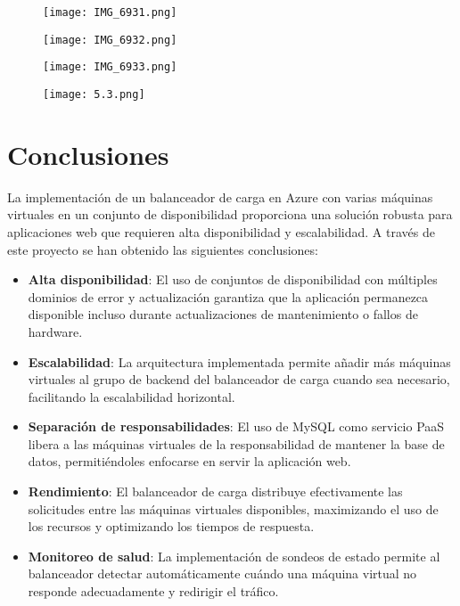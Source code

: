 \documentclass[12pt]{article}
\begin{document}
\begin{figure}[H]
    \centering
    \texttt{[image: IMG\_6931.png]}
\end{figure}

\begin{figure}[H]
    \centering
    \texttt{[image: IMG\_6932.png]}
\end{figure}

\begin{figure}[H]
    \centering
    \texttt{[image: IMG\_6933.png]}
\end{figure}

\begin{figure}[H]
    \centering
    \texttt{[image: 5.3.png]}
\end{figure}

\section*{Conclusiones}

La implementación de un balanceador de carga en Azure con varias máquinas virtuales en un conjunto de disponibilidad proporciona una solución robusta para aplicaciones web que requieren alta disponibilidad y escalabilidad. A través de este proyecto se han obtenido las siguientes conclusiones:

\begin{itemize}
    \item \textbf{Alta disponibilidad}: El uso de conjuntos de disponibilidad con múltiples dominios de error y actualización garantiza que la aplicación permanezca disponible incluso durante actualizaciones de mantenimiento o fallos de hardware.
    
    \item \textbf{Escalabilidad}: La arquitectura implementada permite añadir más máquinas virtuales al grupo de backend del balanceador de carga cuando sea necesario, facilitando la escalabilidad horizontal.
    
    \item \textbf{Separación de responsabilidades}: El uso de MySQL como servicio PaaS libera a las máquinas virtuales de la responsabilidad de mantener la base de datos, permitiéndoles enfocarse en servir la aplicación web.
    
    \item \textbf{Rendimiento}: El balanceador de carga distribuye efectivamente las solicitudes entre las máquinas virtuales disponibles, maximizando el uso de los recursos y optimizando los tiempos de respuesta.
    
    \item \textbf{Monitoreo de salud}: La implementación de sondeos de estado permite al balanceador detectar automáticamente cuándo una máquina virtual no responde adecuadamente y redirigir el tráfico.
\end{itemize}
\end{document}
